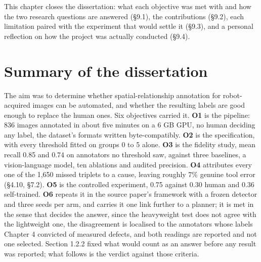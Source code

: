 
This chapter closes the dissertation: what each objective was met with and how the two research questions are answered (\S{}9.1), the contributions (\S{}9.2), each limitation paired with the experiment that would settle it (\S{}9.3), and a personal reflection on how the project was actually conducted (\S{}9.4).

\section{Summary of the dissertation}

The aim was to determine whether spatial-relationship annotation for robot-acquired images can be automated, and whether the resulting labels are good enough to replace the human ones. Six objectives carried it. \textbf{O1} is the pipeline: 836 images annotated in about five minutes on a 6 GB GPU, no human deciding any label, the dataset's formats written byte-compatibly. \textbf{O2} is the specification, with every threshold fitted on groups 0 to 5 alone. \textbf{O3} is the fidelity study, mean recall 0.85 and 0.74 on annotators no threshold saw, against three baselines, a vision-language model, ten ablations and audited precision. \textbf{O4} attributes every one of the 1,650 missed triplets to a cause, leaving roughly 7\% genuine tool error (\S{}4.10, \S{}7.2). \textbf{O5} is the controlled experiment, 0.75 against 0.30 human and 0.36 self-trained. \textbf{O6} repeats it in the source paper's framework with a frozen detector and three seeds per arm, and carries it one link further to a planner; it is met in the sense that decides the answer, since the heavyweight test does not agree with the lightweight one, the disagreement is localised to the annotators whose labels Chapter 4 convicted of measured defects, and both readings are reported and not one selected. Section 1.2.2 fixed what would count as an answer before any result was reported; what follows is the verdict against those criteria.

